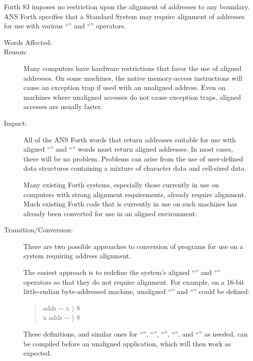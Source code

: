 Forth 83 imposes no restriction upon the alignment of addresses to
any boundary. ANS Forth specifies that a Standard System may require
alignment of addresses for use with various ``'' and
``\word{!}'' operators.

\begin{description}
\item[Words Affected:]
	\word{!}	\word{+!}			
			\word{,}

\item[Reason:]
	Many computers have hardware restrictions that favor the use of
	aligned addresses. On some machines, the native memory-access
	instructions will cause an exception trap if used with an
	unaligned address. Even on machines where unaligned accesses do
	not cause exception traps, aligned accesses are usually faster.

\item[Impact:]
	All of the ANS Forth words that return addresses suitable for
	use with aligned ``'' and ``\word{!}'' words must return
	aligned addresses. In most cases, there will be no problem.
	Problems can arise from the use of user-defined data structures
	containing a mixture of character data and cell-sized data.

	Many existing Forth systems, especially those currently in use on
	computers with strong alignment requirements, already require
	alignment. Much existing Forth code that is currently in use on
	such machines has already been converted for use in an aligned
	environment.

\item[Transition/Conversion:]
	There are two possible approaches to conversion of programs for
	use on a system requiring address alignment.

	The easiest approach is to redefine the system's aligned
	``'' and ``\word{!}'' operators so that they do not
	require alignment. For example, on a 16-bit little-endian
	byte-addressed machine, unaligned ``'' and ``\word{!}''
	could be defined:
	\begin{quote}\ttfamily
		\word{:}   addr -{}- x )
			  
			  8
			 
		\word{;} \\
		\word{:} \word{!}  x addr -{}- )
			 8 
			 
			\word{C!} 
		\word{;}
	\end{quote}
	These definitions, and similar ones for ``\word{+!}'',
	``'', ``'', ``\word{,}'', and
	``'' as needed, can be compiled before an
	unaligned application, which will then work as expected.


\end{description}
